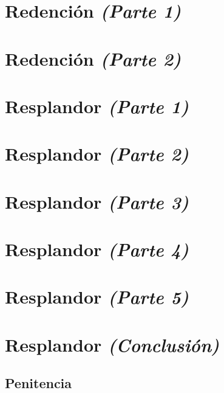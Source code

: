 \documentclass[11pt]{book}
\begin{document}
\chapter{Redención \emph{\mdseries(Parte 1)}}


\chapter{Redención \emph{\mdseries(Parte 2)}}


\chapter{Resplandor \emph{\mdseries(Parte 1)}}


\chapter{Resplandor \emph{\mdseries(Parte 2)}}


\chapter{Resplandor \emph{\mdseries(Parte 3)}}


\chapter{Resplandor \emph{\mdseries(Parte 4)}}


\chapter{Resplandor \emph{\mdseries(Parte 5)}}


\chapter{Resplandor \emph{\mdseries(Conclusión)}}


\begin{appendices}
\renewcommand{\thechapter}{\arabic{chapter}}
\chapter{Penitencia}

\end{appendices}
\end{document}
